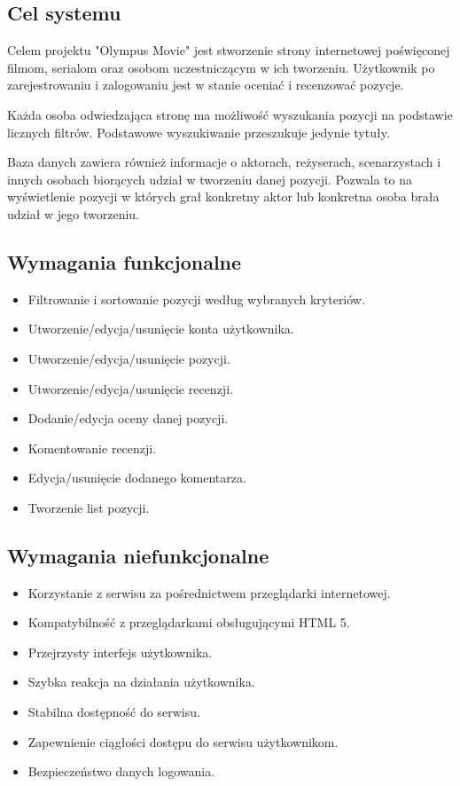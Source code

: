 \documentclass[12pt]{article}
\begin{document}
\begin{flushleft}
		\subsection{Cel systemu}	%
		Celem projektu "Olympus Movie" jest stworzenie strony internetowej poświęconej filmom, serialom oraz osobom uczestniczącym w ich tworzeniu. Użytkownik po zarejestrowaniu i zalogowaniu jest w stanie %
oceniać i recenzować pozycje.
	
	Każda osoba odwiedzająca stronę ma możliwość wyszukania pozycji na podstawie licznych filtrów. Podstawowe wyszukiwanie przeszukuje jedynie tytuły. %
	
	Baza danych zawiera również informacje o aktorach, reżyserach, scenarzystach i innych osobach biorących udział w tworzeniu danej pozycji. Pozwala to na wyświetlenie pozycji w których grał konkretny aktor lub konkretna osoba brała udział w jego tworzeniu.
		
		\subsection{Wymagania funkcjonalne}
			\begin{itemize}
				\item Filtrowanie i sortowanie pozycji według wybranych kryteriów.
				\item Utworzenie/edycja/usunięcie konta użytkownika.
				\item Utworzenie/edycja/usunięcie pozycji.
				\item Utworzenie/edycja/usunięcie recenzji.
				\item Dodanie/edycja oceny danej pozycji.
				\item Komentowanie recenzji.
				\item Edycja/usunięcie dodanego komentarza.
				\item Tworzenie list pozycji.
			\end{itemize}
		
		\subsection{Wymagania niefunkcjonalne}
			\begin{itemize}
				\item Korzystanie z serwisu za pośrednictwem przeglądarki internetowej.
				\item Kompatybilność z przeglądarkami obsługującymi HTML 5.
				\item Przejrzysty interfejs użytkownika.
				\item Szybka reakcja na działania użytkownika.
				\item Stabilna dostępność do serwisu.
				\item Zapewnienie ciągłości dostępu do serwisu użytkownikom.
				\item Bezpieczeństwo danych logowania.
			\end{itemize}
		

\end{flushleft}
\end{document}
